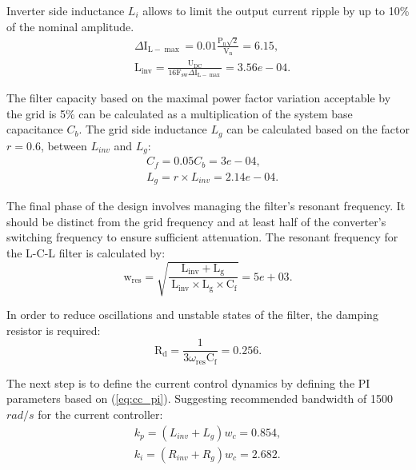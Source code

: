 Inverter side inductance $L_i$ allows to limit the output current ripple by up to 10\% of the nominal amplitude.
\begin{equation}
    \begin{aligned}
        & \Delta \mathrm{I}_{\mathrm{L}-\max }=0.01 \frac{\mathrm{P}_{\mathrm{n}} \sqrt{2}}{\mathrm{V}_{\mathrm{n}}} = 6.15,\\
        & \mathrm{L}_{\mathrm{inv}}=\frac{\mathrm{U}_{\mathrm{DC}}}{16 \mathrm{F}_{\mathrm{sw}} \Delta \mathrm{I}_{\mathrm{L}-\max }} = 3.56e-04.
    \end{aligned}
\end{equation}

The filter capacity based on the maximal power factor variation acceptable by the grid is 5\% can be calculated as a multiplication of the system base capacitance $C_b$. The grid side inductance $L_g$ can be calculated based on the factor $r = 0.6$, between $L_{inv}$ and $L_g$:
\begin{equation}
    \begin{aligned}
        & C_{f}=0.05 C_{b} = 3e-04,\\
        & L_g = r \times L_{inv} = 2.14e-04.
    \end{aligned}
\end{equation}

The final phase of the design involves managing the filter's resonant frequency. It should be distinct from the grid frequency and at least half of the converter's switching frequency to ensure sufficient attenuation. The resonant frequency for the L-C-L filter is calculated by:
\begin{equation}
    \mathrm{w}_{\mathrm{res}}=\sqrt{\frac{\mathrm{L}_{\mathrm{inv}}+\mathrm{L}_{\mathrm{g}}}{\mathrm{~L}_{\mathrm{inv}} \times \mathrm{L}_{\mathrm{g}} \times \mathrm{C}_{\mathrm{f}}}} = 5e+03.
\end{equation}

In order to reduce oscillations and unstable states of the filter, the damping resistor is required:
\begin{equation}
    \mathrm{R}_{\mathrm{d}}=\frac{1}{3 \omega_{\mathrm{res}} \mathrm{C}_{\mathrm{f}}} = 0.256.
\end{equation}

The next step is to define the current control dynamics by defining the PI parameters based on (\ref{eq:cc_pi}). Suggesting recommended bandwidth of 1500 $rad/s$ for the current controller:
\begin{equation}
    \begin{array}{l}
        k_{p}=(L_{inv}+L_{g}) w_c = 0.854, \\
        k_{i}=\left(R_{inv}+R_{g}\right) w_c = 2.682.
    \end{array}
    \label{eq:cc_pi_num}
\end{equation}

